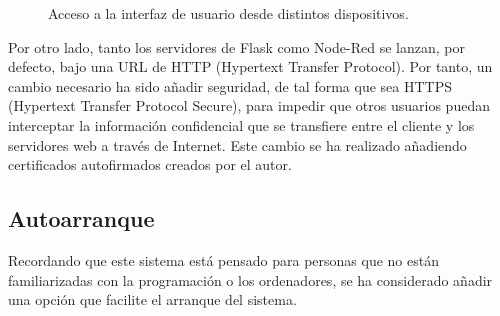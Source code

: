 \begin{figure}[h!]
  \begin{center}
    \hspace{2mm}
  \end{center}
\caption{Acceso a la interfaz de usuario desde distintos dispositivos.} \label{fig:userlogin}
\end{figure}


Por otro lado, tanto los servidores de Flask como Node-Red se lanzan, por defecto, bajo una URL de HTTP (Hypertext Transfer Protocol). Por tanto, un cambio necesario ha sido añadir seguridad, de tal forma que sea HTTPS (Hypertext Transfer Protocol Secure), para impedir que otros usuarios puedan interceptar la información confidencial que se transfiere entre el cliente y los servidores web a través de Internet. Este cambio se ha realizado añadiendo certificados autofirmados creados por el autor.\\

\subsection{Autoarranque}
Recordando que este sistema está pensado para personas que no están familiarizadas con la programación o los ordenadores, se ha considerado añadir una opción que facilite el arranque del sistema.\\

